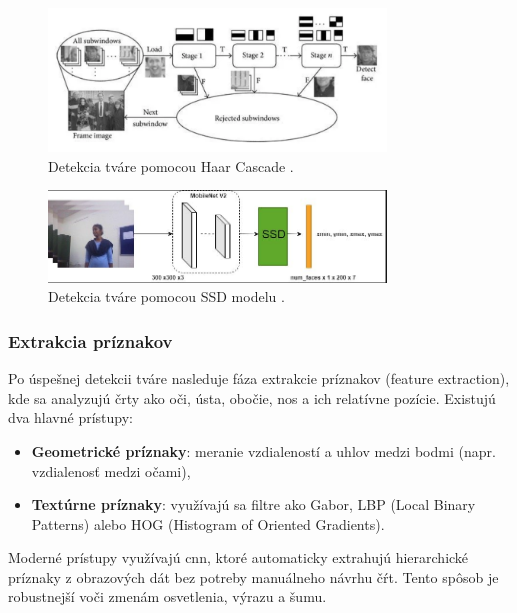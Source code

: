 \begin{figure}[!htpb]
    \centering
    \includegraphics[width=0.8\textwidth]{img/haar_cascade.png}
    \caption{Detekcia tváre pomocou Haar Cascade \cite{haar_cascade_model}.} 
    \label{fig:haar_cascade}
\end{figure}

\begin{figure}[!htpb]
    \centering
    \includegraphics[width=0.8\textwidth]{img/ssd_model.png}
    \caption{Detekcia tváre pomocou SSD modelu \cite{SSD_model}.} 
    \label{fig:ssd_model}
\end{figure}
\vspace{4.5cm}
\subsubsection{Extrakcia príznakov}
Po úspešnej detekcii tváre nasleduje fáza extrakcie príznakov (feature extraction), kde sa analyzujú črty ako oči, ústa, obočie, nos a ich relatívne pozície. Existujú dva hlavné prístupy:

\begin{itemize}
    \item \textbf{Geometrické príznaky}: meranie vzdialeností a uhlov medzi bodmi (napr. vzdialenosť medzi očami),
    \item \textbf{Textúrne príznaky}: využívajú sa filtre ako Gabor, LBP (Local Binary Patterns) alebo HOG (Histogram of Oriented Gradients).
\end{itemize}

Moderné prístupy využívajú \gls{cnn}, ktoré automaticky extrahujú hierarchické príznaky z obrazových dát bez potreby manuálneho návrhu čŕt. Tento spôsob je robustnejší voči zmenám osvetlenia, výrazu a šumu.

